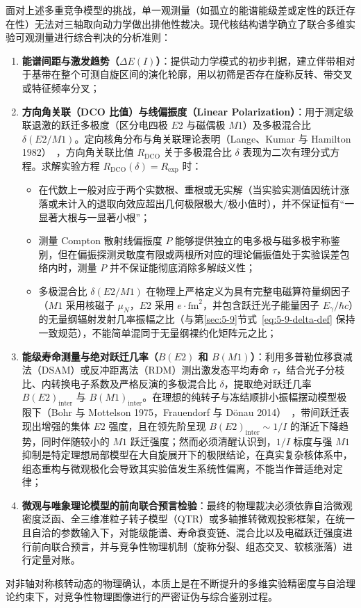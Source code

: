 面对上述多重竞争模型的挑战，单一观测量（如孤立的能谱能级差或定性的跃迁存在性）无法对三轴取向动力学做出排他性裁决。现代核结构谱学确立了联合多维实验可观测量进行综合判决的分析准则：
\begin{enumerate}
\item \textbf{能谱间距与激发趋势（$\Delta E(I)$）}：提供动力学模式的初步判据，建立伴带相对于基带在整个可测自旋区间的演化轮廓，用以初筛是否存在旋称反转、带交叉或特征频率分叉；
\item \textbf{方向角关联（DCO 比值）与线偏振度（Linear Polarization）}：用于测定级联退激的跃迁多极度（区分电四极 $E2$ 与磁偶极 $M1$）及多极混合比 $\delta(E2/M1)$。定向核角分布与角关联理论表明（Lange、Kumar 与 Hamilton 1982）~\cite{lange-kumar-hamilton-1982-multipole-admixtures}，方向角关联比值 $R_{\text{DCO}}$ 关于多极混合比 $\delta$ 表现为二次有理分式方程。求解实验方程 $R_{\text{DCO}}(\delta) = R_{\text{exp}}$ 时：
\begin{itemize}
\item 在代数上一般对应于两个实数根、重根或无实解（当实验实测值因统计涨落或未计入的退取向效应超出几何极限极大/极小值时），并不保证恒有“一显著大根与一显著小根”；
\item 测量 Compton 散射线偏振度 $P$ 能够提供独立的电多极与磁多极宇称鉴别，但在偏振探测灵敏度有限或两根所对应的理论偏振值处于实验误差包络内时，测量 $P$ 并不保证能彻底消除多解歧义性；
\item 多极混合比 $\delta(E2/M1)$ 在物理上严格定义为具有完整电磁算符量纲因子（$M1$ 采用核磁子 $\mu_N$，$E2$ 采用 $e\cdot\mathrm{fm}^2$，并包含跃迁光子能量因子 $E_\gamma/\hbar c$）的无量纲辐射发射几率振幅之比（与第\ref{sec:5-9}节式~\eqref{eq:5-9-delta-def} 保持一致规范），不能简单混同于无量纲裸约化矩阵元之比；
\end{itemize}
\item \textbf{能级寿命测量与绝对跃迁几率（$B(E2)$ 和 $B(M1)$）}：利用多普勒位移衰减法（DSAM）或反冲距离法（RDM）测出激发态平均寿命 $\tau$，结合光子分枝比、内转换电子系数及严格反演的多极混合比 $\delta$，提取绝对跃迁几率 $B(E2)_{\text{inter}}$ 与 $B(M1)_{\text{inter}}$。在理想的纯转子与冻结顺排小振幅摆动模型极限下（Bohr 与 Mottelson 1975，Frauendorf 与 D{\"o}nau 2014）~\cite{book-bohr-mottelson-nuclear-structure-vol2,frauendorf-2014-transverse-wobbling}，带间跃迁表现出增强的集体 $E2$ 强度，且在领先阶呈现 $B(E2)_{\text{inter}} \sim 1/I$ 的渐近下降趋势，同时伴随较小的 $M1$ 跃迁强度；然而必须清醒认识到，$1/I$ 标度与强 $M1$ 抑制是特定理想局部模型在大自旋展开下的极限结论，在真实复杂核体系中，组态重构与微观极化会导致其实验值发生系统性偏离，不能当作普适绝对定律；
\item \textbf{微观与唯象理论模型的前向联合预言检验}：最终的物理裁决必须依靠自洽微观密度泛函、全三维准粒子转子模型（QTR）或多轴推转微观投影框架，在统一且自洽的参数输入下，对能级能谱、寿命衰变链、混合比以及电磁跃迁强度进行前向联合预言，并与竞争性物理机制（旋称分裂、组态交叉、软核涨落）进行定量对账。
\end{enumerate}

对非轴对称核转动态的物理确认，本质上是在不断提升的多维实验精密度与自洽理论约束下，对竞争性物理图像进行的严密证伪与综合鉴别过程。
